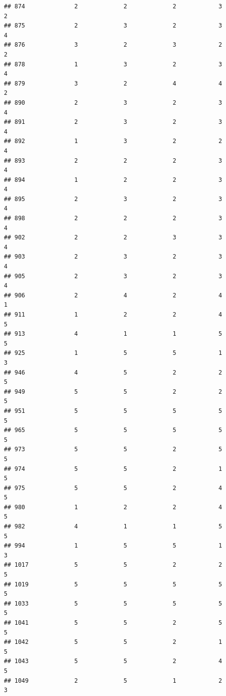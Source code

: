 \documentclass[
]{article}
\begin{document}
\begin{verbatim}
## 874              2             2             2            3          2
## 875              2             3             2            3          4
## 876              3             2             3            2          2
## 878              1             3             2            3          4
## 879              3             2             4            4          2
## 890              2             3             2            3          4
## 891              2             3             2            3          4
## 892              1             3             2            2          4
## 893              2             2             2            3          4
## 894              1             2             2            3          4
## 895              2             3             2            3          4
## 898              2             2             2            3          4
## 902              2             2             3            3          4
## 903              2             3             2            3          4
## 905              2             3             2            3          4
## 906              2             4             2            4          1
## 911              1             2             2            4          5
## 913              4             1             1            5          5
## 925              1             5             5            1          3
## 946              4             5             2            2          5
## 949              5             5             2            2          5
## 951              5             5             5            5          5
## 965              5             5             5            5          5
## 973              5             5             2            5          5
## 974              5             5             2            1          5
## 975              5             5             2            4          5
## 980              1             2             2            4          5
## 982              4             1             1            5          5
## 994              1             5             5            1          3
## 1017             5             5             2            2          5
## 1019             5             5             5            5          5
## 1033             5             5             5            5          5
## 1041             5             5             2            5          5
## 1042             5             5             2            1          5
## 1043             5             5             2            4          5
## 1049             2             5             1            2          3

\end{verbatim}
\end{document}
